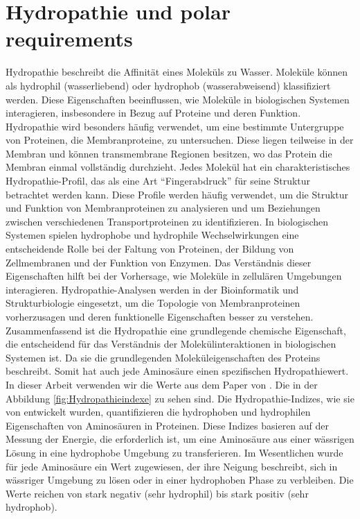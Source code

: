 \documentclass[german,version-2022-01]{uzl-thesis}
\begin{document}
\section{Hydropathie und polar requirements}
Hydropathie beschreibt die Affinit\"at eines Molek\"uls zu Wasser. Molek\"ule k\"onnen als hydrophil (wasserliebend) oder hydrophob (wasserabweisend) klassifiziert werden. Diese Eigenschaften beeinflussen, wie Molek\"ule in biologischen Systemen interagieren, insbesondere in Bezug auf Proteine und deren Funktion. Hydropathie wird besonders h\"aufig verwendet, um eine bestimmte Untergruppe von Proteinen, die Membranproteine, zu untersuchen. Diese liegen teilweise in der Membran und k\"onnen transmembrane Regionen besitzen, wo das Protein die Membran einmal vollst\"andig durchzieht. Jedes Molek\"ul hat ein charakteristisches Hydropathie-Profil, das als eine Art "`Fingerabdruck"' f\"ur seine Struktur betrachtet werden kann. Diese Profile werden h\"aufig verwendet, um die Struktur und Funktion von Membranproteinen zu analysieren und um Beziehungen zwischen verschiedenen Transportproteinen zu identifizieren. In biologischen Systemen spielen hydrophobe und hydrophile Wechselwirkungen eine entscheidende Rolle bei der Faltung von Proteinen, der Bildung von Zellmembranen und der Funktion von Enzymen. Das Verst\"andnis dieser Eigenschaften hilft bei der Vorhersage, wie Molek\"ule in zellul\"aren Umgebungen interagieren. Hydropathie-Analysen werden in der Bioinformatik und Strukturbiologie eingesetzt, um die Topologie von Membranproteinen vorherzusagen und deren funktionelle Eigenschaften besser zu verstehen. Zusammenfassend ist die Hydropathie eine grundlegende chemische Eigenschaft, die entscheidend f\"ur das Verst\"andnis der Molek\"ulinteraktionen in biologischen Systemen ist. Da sie die grundlegenden Molek\"uleigenschaften des Proteins beschreibt. 
Somit hat auch jede Aminos\"aure einen spezifischen Hydropathiewert. In dieser Arbeit verwenden wir die Werte aus dem Paper  von \citeauthor{kyte_simple_1982} \cite{kyte_simple_1982}. Die in der Abbildung \ref{fig:Hydropathieindexe} zu sehen sind. Die Hydropathie-Indizes, wie sie von \citeauthor{kyte_simple_1982} entwickelt wurden, quantifizieren die hydrophoben und hydrophilen Eigenschaften von Aminos\"auren in Proteinen. Diese Indizes basieren auf der Messung der Energie, die erforderlich ist, um eine Aminos\"aure aus einer w\"assrigen L\"osung in eine hydrophobe Umgebung zu transferieren. Im Wesentlichen wurde f\"ur jede Aminos\"aure ein Wert zugewiesen, der ihre Neigung beschreibt, sich in w\"assriger Umgebung zu l\"osen oder in einer hydrophoben Phase zu verbleiben. Die Werte reichen von stark negativ (sehr hydrophil) bis stark positiv (sehr hydrophob).
\end{document}
